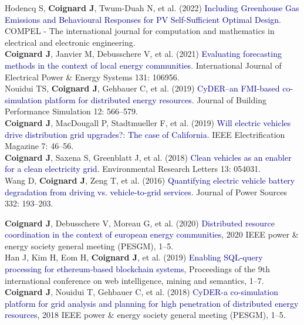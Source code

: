 \documentclass[11pt,a4paper,sans]{moderncv}        %
\begin{document}
Hodencq S, \textbf{Coignard J}, Twum-Duah N, et al. (2022) \textcolor{darkblue}{Including Greenhouse Gas Emissions and Behavioural Responses for PV Self-Sufficient Optimal Design}. COMPEL - The international journal for computation and mathematics in electrical and electronic engineering.\\

\textbf{Coignard J}, Janvier M, Debusschere V, et al. (2021) \textcolor{darkblue}{Evaluating forecasting methods in the context of local energy communities}. International Journal of Electrical Power \& Energy Systems 131: 106956.\\

Nouidui TS, \textbf{Coignard J}, Gehbauer C, et al. (2019) \textcolor{darkblue}{CyDER–an FMI-based co-simulation platform for distributed energy resources}. Journal of Building Performance Simulation 12: 566–579.\\

\textbf{Coignard J}, MacDougall P, Stadtmueller F, et al. (2019) \textcolor{darkblue}{Will electric vehicles drive distribution grid upgrades?: The case of California}. IEEE Electrification Magazine 7: 46–56.\\

\textbf{Coignard J}, Saxena S, Greenblatt J, et al. (2018) \textcolor{darkblue}{Clean vehicles as an enabler for a clean electricity grid}. Environmental Research Letters 13: 054031.\\

Wang D, \textbf{Coignard J}, Zeng T, et al. (2016) \textcolor{darkblue}{Quantifying electric vehicle battery degradation from driving vs. vehicle-to-grid services}. Journal of Power Sources 332: 193–203.

\vspace{0.3cm}
\textbf{Coignard J}, Debusschere V, Moreau G, et al. (2020) \textcolor{darkblue}{Distributed resource coordination in the context of european energy communities}, 2020 IEEE power \& energy society general meeting (PESGM), 1–5.\\

Han J, Kim H, Eom H, \textbf{Coignard J}, et al. (2019) \textcolor{darkblue}{Enabling SQL-query processing for ethereum-based blockchain systems}, Proceedings of the 9th international conference on web intelligence, mining and semantics, 1–7.\\

\textbf{Coignard J}, Nouidui T, Gehbauer C, et al. (2018) \textcolor{darkblue}{CyDER-a co-simulation platform for grid analysis and planning for high penetration of distributed energy resources}, 2018 IEEE power \& energy society general meeting (PESGM), 1–5.\\
\end{document}
